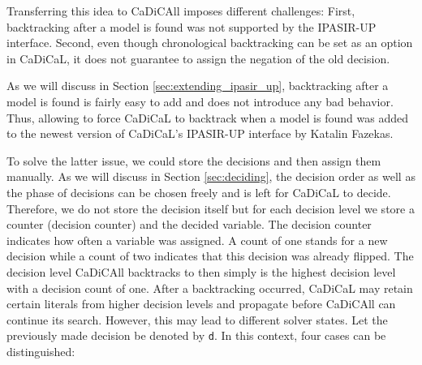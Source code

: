 \documentclass[12pt,a4paper]{article}
\begin{document}
Transferring this idea to CaDiCAll imposes different challenges: First, backtracking after a model is found was not supported by the IPASIR-UP interface. Second, even though chronological backtracking can be set as an option in CaDiCaL, it does not guarantee to assign the negation of the old decision.

As we will discuss in Section \ref{sec:extending_ipasir_up}, backtracking after a model is found is fairly easy to add and does not introduce any bad behavior. Thus, allowing to force CaDiCaL to backtrack when a model is found was added to the newest version of CaDiCaL's IPASIR-UP interface by Katalin Fazekas.

To solve the latter issue, we could store the decisions and then assign them manually. As we will discuss in Section \ref{sec:deciding}, the decision order as well as the phase of decisions can be chosen freely and is left for CaDiCaL to decide. Therefore, we do not store the decision itself but for each decision level we store a counter (decision counter) and the decided variable. The decision counter indicates how often a variable was assigned. A count of one stands for a new decision while a count of two indicates that this decision was already flipped. The decision level CaDiCAll backtracks to then simply is the highest decision level with a decision count of one. After a backtracking occurred, CaDiCaL may retain certain literals from higher decision levels and propagate before CaDiCAll can continue its search. However, this may lead to different solver states. Let the previously made decision be denoted by \verb|d|. In this context, four cases can be distinguished:
\end{document}
